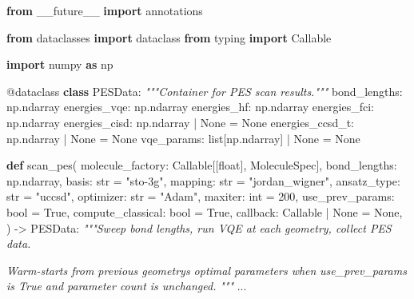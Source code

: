 \documentclass[
  11pt,
]{report}
\newenvironment{Shaded}{}{}
\newcommand{\AttributeTok}[1]{\textcolor[rgb]{0.49,0.56,0.16}{#1}}
\newcommand{\BuiltInTok}[1]{\textcolor[rgb]{0.00,0.50,0.00}{#1}}
\newcommand{\CommentTok}[1]{\textcolor[rgb]{0.38,0.63,0.69}{\textit{#1}}}
\newcommand{\DecValTok}[1]{\textcolor[rgb]{0.25,0.63,0.44}{#1}}
\newcommand{\ImportTok}[1]{\textcolor[rgb]{0.00,0.50,0.00}{\textbf{#1}}}
\newcommand{\KeywordTok}[1]{\textcolor[rgb]{0.00,0.44,0.13}{\textbf{#1}}}
\newcommand{\NormalTok}[1]{#1}
\newcommand{\OperatorTok}[1]{\textcolor[rgb]{0.40,0.40,0.40}{#1}}
\newcommand{\StringTok}[1]{\textcolor[rgb]{0.25,0.44,0.63}{#1}}
\newcommand{\VariableTok}[1]{\textcolor[rgb]{0.10,0.09,0.49}{#1}}
\begin{document}
\begin{Shaded}
\begin{Highlighting}[]
\ImportTok{from}\NormalTok{ \_\_future\_\_ }\ImportTok{import}\NormalTok{ annotations}

\ImportTok{from}\NormalTok{ dataclasses }\ImportTok{import}\NormalTok{ dataclass}
\ImportTok{from}\NormalTok{ typing }\ImportTok{import}\NormalTok{ Callable}

\ImportTok{import}\NormalTok{ numpy }\ImportTok{as}\NormalTok{ np}


\AttributeTok{@dataclass}
\KeywordTok{class}\NormalTok{ PESData:}
    \CommentTok{"""Container for PES scan results."""}
\NormalTok{    bond\_lengths: np.ndarray}
\NormalTok{    energies\_vqe: np.ndarray}
\NormalTok{    energies\_hf: np.ndarray}
\NormalTok{    energies\_fci: np.ndarray}
\NormalTok{    energies\_cisd: np.ndarray }\OperatorTok{|} \VariableTok{None} \OperatorTok{=} \VariableTok{None}
\NormalTok{    energies\_ccsd\_t: np.ndarray }\OperatorTok{|} \VariableTok{None} \OperatorTok{=} \VariableTok{None}
\NormalTok{    vqe\_params: }\BuiltInTok{list}\NormalTok{[np.ndarray] }\OperatorTok{|} \VariableTok{None} \OperatorTok{=} \VariableTok{None}


\KeywordTok{def}\NormalTok{ scan\_pes(}
\NormalTok{    molecule\_factory: Callable[[}\BuiltInTok{float}\NormalTok{], MoleculeSpec],}
\NormalTok{    bond\_lengths: np.ndarray,}
\NormalTok{    basis: }\BuiltInTok{str} \OperatorTok{=} \StringTok{"sto{-}3g"}\NormalTok{,}
\NormalTok{    mapping: }\BuiltInTok{str} \OperatorTok{=} \StringTok{"jordan\_wigner"}\NormalTok{,}
\NormalTok{    ansatz\_type: }\BuiltInTok{str} \OperatorTok{=} \StringTok{"uccsd"}\NormalTok{,}
\NormalTok{    optimizer: }\BuiltInTok{str} \OperatorTok{=} \StringTok{"Adam"}\NormalTok{,}
\NormalTok{    maxiter: }\BuiltInTok{int} \OperatorTok{=} \DecValTok{200}\NormalTok{,}
\NormalTok{    use\_prev\_params: }\BuiltInTok{bool} \OperatorTok{=} \VariableTok{True}\NormalTok{,}
\NormalTok{    compute\_classical: }\BuiltInTok{bool} \OperatorTok{=} \VariableTok{True}\NormalTok{,}
\NormalTok{    callback: Callable }\OperatorTok{|} \VariableTok{None} \OperatorTok{=} \VariableTok{None}\NormalTok{,}
\NormalTok{) }\OperatorTok{{-}\textgreater{}}\NormalTok{ PESData:}
    \CommentTok{"""Sweep bond lengths, run VQE at each geometry, collect PES data.}

\CommentTok{    Warm{-}starts from previous geometry\textquotesingle{}s optimal parameters when}
\CommentTok{    use\_prev\_params is True and parameter count is unchanged.}
\CommentTok{    """}
\NormalTok{    ...}
\end{Highlighting}
\end{Shaded}
\end{document}
